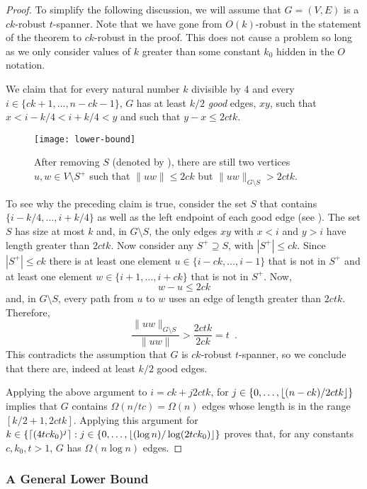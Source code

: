 \documentclass{patmorin}
\begin{document}
\begin{proof}
  To simplify the following discussion, we will assume that $G=(V,E)$ is
  a $ck$-robust $t$-spanner.  Note that we have gone from $O(k)$-robust
  in the statement of the theorem to $ck$-robust in the proof.  This does
  not cause a problem so long as we only consider values of $k$ greater
  than some constant $k_0$ hidden in the $O$ notation.

  We claim that for every natural number $k$ divisible by 4 and every
  $i\in\{ck+1,\ldots,n-ck-1\}$, $G$ has at least $k/2$ \emph{good} edges,
  $xy$, such that $x < i-k/4 < i+k/4 < y$ and such that $y-x \le 2ctk$.

  \begin{figure}
    \begin{center}\texttt{[image: lower-bound]}\end{center}
    \caption{After removing $S$ (denoted by \textbullet), there are
      still two vertices $u,w\in V\setminus S^+$ such that $\|uw\|\le 2ck$
      but $\|uw\|_{G\setminus S} > 2ctk$.}
  \end{figure}
  To see why the preceding claim is true, consider the set $S$ that
  contains $\{i-k/4,\ldots,i+k/4\}$ as well as the left endpoint of each
  good edge (see ).  The set $S$ has size at most
  $k$ and, in $G\setminus S$, the only edges $xy$ with $x<i$ and $y>i$
  have length greater than $2ctk$.  Now consider any $S^+\supseteq S$,
  with $|S^+|\le ck$.  Since $|S^+|\le ck$ there is at least one element
  $u\in\{i-ck,\ldots,i-1\}$ that is not in $S^+$ and at least one element
  $w\in\{i+1,\ldots,i+ck\}$ that is not in $S^+$.  Now,
  \[    w-u \le 2ck \]
  and, in $G\setminus S$, every path from $u$ to $w$ uses an edge of length
  greater than $2ctk$.  Therefore,
  \[
     \frac{\|uw\|_{G\setminus S}}{\|uw\|} > \frac{2ctk}{2ck} = t \enspace .
  \]
  This contradicts the assumption that $G$ is $ck$-robust $t$-spanner, so we
  conclude that there are, indeed at least $k/2$ good edges.
  
  Applying the above argument to $i=ck+j2ctk$, for
  $j\in\{0,\ldots,{\lfloor (n-ck)/2ctk \rfloor}\}$ implies that $G$ contains
  $\Omega(n/tc)=\Omega(n)$ edges whose length is in the range
  $[k/2+1,2ctk]$.  Applying this argument for $k\in\{{\lceil (4tck_0)^{j} \rceil}
  : j\in\{0,\ldots,{\lfloor (\log n)/\log(2tck_0) \rfloor}\}$ proves that, for
  any constants $c,k_0,t>1$, $G$ has $\Omega(n\log n)$ edges.
\end{proof}


\subsubsection{A General Lower Bound}
\end{document}
